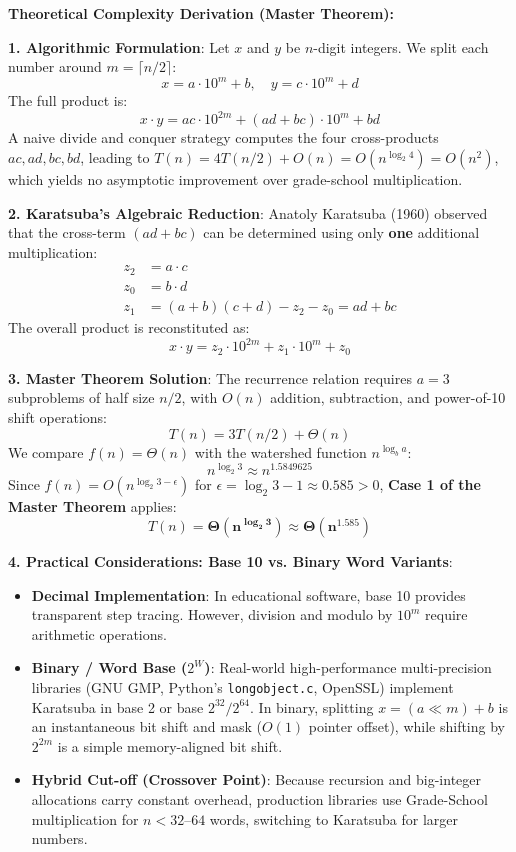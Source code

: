 \documentclass[12pt]{article}
\begin{document}
\newpage

\textbf{Theoretical Complexity Derivation (Master Theorem):}

\textbf{1. Algorithmic Formulation}:
Let $x$ and $y$ be $n$-digit integers. We split each number around $m = \lceil n/2 \rceil$:
\[
x = a \cdot 10^m + b, \quad y = c \cdot 10^m + d
\]
The full product is:
\[
x \cdot y = ac \cdot 10^{2m} + (ad + bc) \cdot 10^m + bd
\]
A naive divide and conquer strategy computes the four cross-products $ac, ad, bc, bd$, leading to $T(n) = 4T(n/2) + O(n) = O(n^{\log_2 4}) = O(n^2)$, which yields no asymptotic improvement over grade-school multiplication.

\textbf{2. Karatsuba's Algebraic Reduction}:
Anatoly Karatsuba (1960) observed that the cross-term $(ad + bc)$ can be determined using only \textbf{one} additional multiplication:
\begin{align*}
z_2 &= a \cdot c \\
z_0 &= b \cdot d \\
z_1 &= (a + b)(c + d) - z_2 - z_0 = ad + bc
\end{align*}
The overall product is reconstituted as:
\[
x \cdot y = z_2 \cdot 10^{2m} + z_1 \cdot 10^m + z_0
\]

\textbf{3. Master Theorem Solution}:
The recurrence relation requires $a = 3$ subproblems of half size $n/2$, with $O(n)$ addition, subtraction, and power-of-10 shift operations:
\[
T(n) = 3 T(n/2) + \Theta(n)
\]
We compare $f(n) = \Theta(n)$ with the watershed function $n^{\log_b a}$:
\[
n^{\log_2 3} \approx n^{1.5849625}
\]
Since $f(n) = O(n^{\log_2 3 - \epsilon})$ for $\epsilon = \log_2 3 - 1 \approx 0.585 > 0$, \textbf{Case 1 of the Master Theorem} applies:
\[
T(n) = \mathbf{\Theta(n^{\log_2 3})} \approx \mathbf{\Theta(n^{1.585})}
\]

\textbf{4. Practical Considerations: Base 10 vs. Binary Word Variants}:
\begin{itemize}
    \item \textbf{Decimal Implementation}: In educational software, base 10 provides transparent step tracing. However, division and modulo by $10^m$ require arithmetic operations.
    \item \textbf{Binary / Word Base ($2^W$)}: Real-world high-performance multi-precision libraries (GNU GMP, Python's \texttt{longobject.c}, OpenSSL) implement Karatsuba in base 2 or base $2^{32} / 2^{64}$. In binary, splitting $x = (a \ll m) + b$ is an instantaneous bit shift and mask ($O(1)$ pointer offset), while shifting by $2^{2m}$ is a simple memory-aligned bit shift.
    \item \textbf{Hybrid Cut-off (Crossover Point)}: Because recursion and big-integer allocations carry constant overhead, production libraries use Grade-School multiplication for $n < 32\text{--}64$ words, switching to Karatsuba for larger numbers.
\end{itemize}
\end{document}
